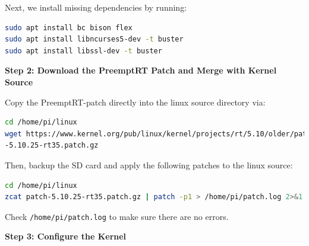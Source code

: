 \documentclass[a4paper,10pt]{article}
\newcommand{\code}[1]{\colorbox{light-gray}{\texttt{#1}}}
\begin{document}
Next, we install missing dependencies by running:
\begin{center}
\begin{lstlisting}[language=bash, label=code:code8] 
sudo apt install bc bison flex
sudo apt install libncurses5-dev -t buster
sudo apt install libssl-dev -t buster
\end{lstlisting}
\end{center}\vspace{-1em}



\textbf{Step 2: Download the PreemptRT Patch and Merge with Kernel Source}

Copy the PreemptRT-patch directly into the linux source directory via:
\begin{center}
\begin{lstlisting}[language=bash, label=code:code9] 
cd /home/pi/linux
wget https://www.kernel.org/pub/linux/kernel/projects/rt/5.10/older/patch
-5.10.25-rt35.patch.gz
\end{lstlisting}
\end{center}\vspace{-1em}


Then, backup the SD card and apply the following patches to the linux source:
\begin{center}
\begin{lstlisting}[language=bash, label=code:code10] 
cd /home/pi/linux
zcat patch-5.10.25-rt35.patch.gz | patch -p1 > /home/pi/patch.log 2>&1
\end{lstlisting}
\end{center}\vspace{-1em}



Check \code{/home/pi/patch.log} to make sure there are no errors. 

\textbf{Step 3: Configure the Kernel}
\end{document}
